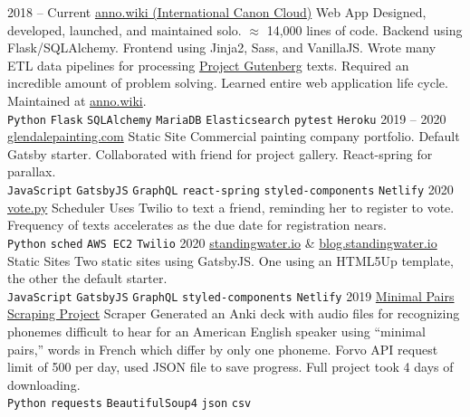 \documentclass[9pt]{developercv} %
\begin{document}
\begin{entrylist}
	\entry
		{2018 -- Current}
        {{\href{https://github.com/malan88/icc}{anno.wiki (International Canon Cloud)}}}
		{Web App}
        {Designed, developed, launched, and maintained solo. $\approx$ 14,000
        lines of code. Backend using Flask/SQLAlchemy. Frontend using Jinja2,
        Sass, and VanillaJS. Wrote many ETL data pipelines for processing
        {\href{https://gutenberg.org}{Project Gutenberg}} texts. Required an
        incredible amount of problem solving. Learned entire web application
        life cycle. Maintained at {\href{https://anno.wiki}{anno.wiki}}.
        \\
        \texttt{Python}\slashsep
        \texttt{Flask}\slashsep
        \texttt{SQLAlchemy}\slashsep
        \texttt{MariaDB}\slashsep
        \texttt{Elasticsearch}\slashsep
        \texttt{pytest}\slashsep
        \texttt{Heroku}
        }
	\entry
		{2019 -- 2020}
        {{\href{https://glendalepainting.netlify.app}{glendalepainting.com}}}
		{Static Site}
        {Commercial painting company portfolio. Default Gatsby starter.
        Collaborated with friend for project gallery. React-spring for parallax.
        \\
        \texttt{JavaScript}\slashsep
        \texttt{GatsbyJS}\slashsep
        \texttt{GraphQL}\slashsep
        \texttt{react-spring}\slashsep
        \texttt{styled-components}\slashsep
        \texttt{Netlify}
        }
	\entry
		{2020}
        {\href{https://github.com/malan88/vote}{vote.py}}
		{Scheduler}
        {Uses Twilio to text a friend, reminding her to register to vote.
        Frequency of texts accelerates as the due date for registration nears.
        \\
        \texttt{Python}\slashsep
        \texttt{sched}\slashsep
        \texttt{AWS EC2}\slashsep
        \texttt{Twilio}
        }
    \entry
        {2020}
        {
            {\href{https://standingwater.io}{standingwater.io}}
            \& {\href{https://blog.standingwater.io}{blog.standingwater.io}}
        }
        {Static Sites}
        {Two static sites using GatsbyJS. One using an HTML5Up
        template, the other the default starter.
        \\
        \texttt{JavaScript}\slashsep
        \texttt{GatsbyJS}\slashsep
        \texttt{GraphQL}\slashsep
        \texttt{styled-components}\slashsep
        \texttt{Netlify}
        }
	\entry
		{2019}
        {
            \href{https://github.com/malan88/minimalpairs}
            {Minimal Pairs Scraping Project}
        }
		{Scraper}
        {Generated an Anki deck with audio files for recognizing phonemes
        difficult to hear for an American English speaker using “minimal pairs,”
        words in French which differ by only one phoneme. Forvo API request
        limit of 500 per day, used JSON file to save progress. Full project took
        4 days of downloading.
        \\
        \texttt{Python}\slashsep
        \texttt{requests}\slashsep
        \texttt{BeautifulSoup4}\slashsep
        \texttt{json}\slashsep
        \texttt{csv}
        }
\end{entrylist}
\end{document}
